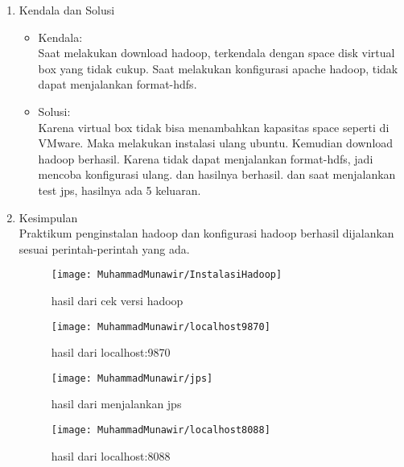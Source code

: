 
\begin{enumerate}
\item Kendala dan Solusi
\begin{itemize}
\item Kendala: \\
Saat melakukan download hadoop, terkendala dengan space disk virtual box yang tidak cukup. Saat melakukan konfigurasi apache hadoop, tidak dapat menjalankan format-hdfs. 

\item Solusi: \\
Karena virtual box tidak bisa menambahkan kapasitas space seperti di VMware. Maka melakukan instalasi ulang ubuntu. Kemudian download hadoop berhasil.
Karena tidak dapat menjalankan format-hdfs, jadi mencoba konfigurasi ulang. dan hasilnya berhasil. dan saat menjalankan test jps, hasilnya ada 5 keluaran.
\end{itemize}

\item Kesimpulan \\
Praktikum penginstalan hadoop dan konfigurasi hadoop berhasil dijalankan sesuai perintah-perintah yang ada.

\begin{figure}[!ht]
\texttt{[image: MuhammadMunawir/InstalasiHadoop]}
\caption{hasil dari cek versi hadoop}
\end{figure}

\begin{figure}[!ht]
\texttt{[image: MuhammadMunawir/localhost9870]}
\caption{hasil dari localhost:9870}
\end{figure}

\begin{figure}[!ht]
\texttt{[image: MuhammadMunawir/jps]}
\caption{hasil dari menjalankan jps}
\end{figure}

\begin{figure}[!ht]
\texttt{[image: MuhammadMunawir/localhost8088]}
\caption{hasil dari localhost:8088}
\end{figure}

\end{enumerate}

